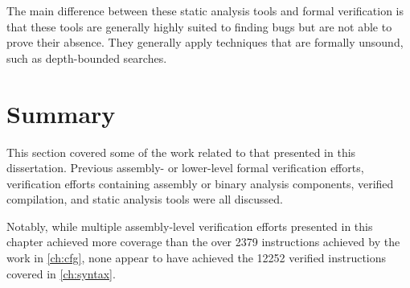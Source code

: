 The main difference between these static analysis tools and formal verification
is that these tools are generally highly suited to finding bugs
but are not able to prove their absence.
They generally apply techniques that are formally unsound, such as depth-bounded searches.

\section{Summary}
This section covered some of the work related to that presented in this dissertation.
Previous assembly- or lower-level formal verification efforts,
verification efforts containing assembly or binary analysis components,
verified compilation, and static analysis tools were all discussed.

Notably, while multiple assembly-level verification efforts
presented in this chapter achieved more coverage
than the over \num{2379} instructions achieved by the work in \cref{ch:cfg},
none appear to have achieved the \num{12252}
verified instructions covered in \cref{ch:syntax}.
